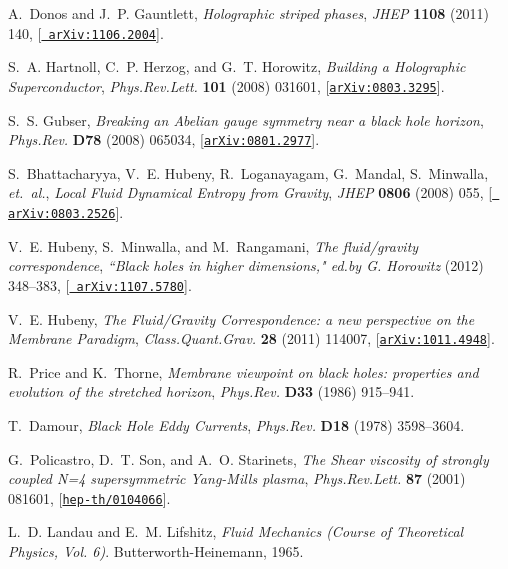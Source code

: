 \documentclass[12pt,a4paper]{article}
\begin{document}
\begin{thebibliography}{100}
A.~Donos and J.~P. Gauntlett, {\it {Holographic striped phases}},  {\em JHEP}
  {\bf 1108} (2011) 140, [\href{http://xxx.lanl.gov/abs/1106.2004}{{\tt
  arXiv:1106.2004}}].

S.~A. Hartnoll, C.~P. Herzog, and G.~T. Horowitz, {\it {Building a Holographic
  Superconductor}},  {\em Phys.Rev.Lett.} {\bf 101} (2008) 031601,
  [\href{http://xxx.lanl.gov/abs/0803.3295}{{\tt arXiv:0803.3295}}].

S.~S. Gubser, {\it {Breaking an Abelian gauge symmetry near a black hole
  horizon}},  {\em Phys.Rev.} {\bf D78} (2008) 065034,
  [\href{http://xxx.lanl.gov/abs/0801.2977}{{\tt arXiv:0801.2977}}].

S.~Bhattacharyya, V.~E. Hubeny, R.~Loganayagam, G.~Mandal, S.~Minwalla, {\em
  et.~al.}, {\it {Local Fluid Dynamical Entropy from Gravity}},  {\em JHEP}
  {\bf 0806} (2008) 055, [\href{http://xxx.lanl.gov/abs/0803.2526}{{\tt
  arXiv:0803.2526}}].

V.~E. Hubeny, S.~Minwalla, and M.~Rangamani, {\it {The fluid/gravity
  correspondence}},  {\em ``Black holes in higher dimensions," ed.by G.
  Horowitz} (2012) 348--383, [\href{http://xxx.lanl.gov/abs/1107.5780}{{\tt
  arXiv:1107.5780}}].

V.~E. Hubeny, {\it {The Fluid/Gravity Correspondence: a new perspective on the
  Membrane Paradigm}},  {\em Class.Quant.Grav.} {\bf 28} (2011) 114007,
  [\href{http://xxx.lanl.gov/abs/1011.4948}{{\tt arXiv:1011.4948}}].

R.~Price and K.~Thorne, {\it {Membrane viewpoint on black holes: properties and
  evolution of the stretched horizon}},  {\em Phys.Rev.} {\bf D33} (1986)
  915--941.

T.~Damour, {\it {Black Hole Eddy Currents}},  {\em Phys.Rev.} {\bf D18} (1978)
  3598--3604.

G.~Policastro, D.~T. Son, and A.~O. Starinets, {\it {The Shear viscosity of
  strongly coupled N=4 supersymmetric Yang-Mills plasma}},  {\em
  Phys.Rev.Lett.} {\bf 87} (2001) 081601,
  [\href{http://xxx.lanl.gov/abs/hep-th/0104066}{{\tt hep-th/0104066}}].

L.~D. Landau and E.~M. Lifshitz, {\em {Fluid Mechanics (Course of Theoretical
  Physics, Vol. 6)}}.
\newblock Butterworth-Heinemann, 1965.


\end{thebibliography}
\end{document}
